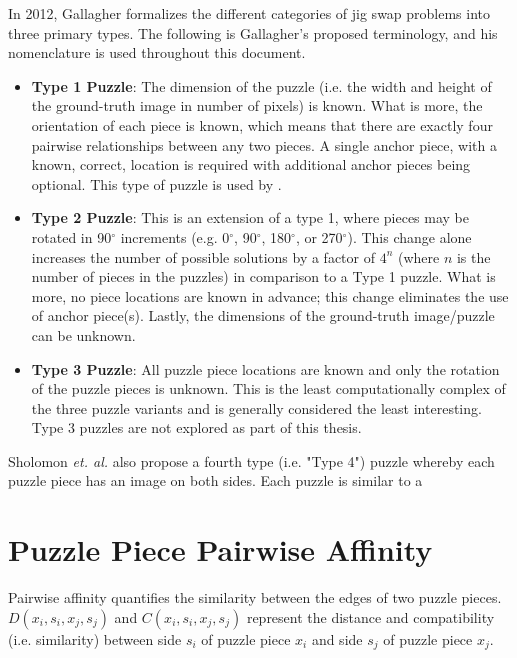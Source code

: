 \documentclass{report}
\newcommand{\numbwithdegreesymbol}[1]{#1$^\circ$}
\begin{document}
In 2012, Gallagher \cite{gallagher2012} formalizes the different categories of jig swap problems into three primary types.  The following is Gallagher's proposed terminology, and his nomenclature is used throughout this document.

\begin{itemize}

	\item \textbf{Type 1 Puzzle}: The dimension of the puzzle (i.e. the width and height of the ground-truth image in number of pixels) is known.  What is more, the orientation of each piece is known, which means that there are exactly four pairwise relationships between any two pieces.  A single anchor piece, with a known, correct, location is required with additional anchor pieces being optional.  This type of puzzle is used by \cite{cho2010, pomeranz2011}.
	
	\item \textbf{Type 2 Puzzle}: This is an extension of a type 1, where pieces may be rotated in \numbwithdegreesymbol{90} increments (e.g. \numbwithdegreesymbol{0}, \numbwithdegreesymbol{90}, \numbwithdegreesymbol{180}, or \numbwithdegreesymbol{270}).  This change alone increases the number of possible solutions by a factor of $4^n$ (where $n$ is the number of pieces in the puzzles) in comparison to a Type 1 puzzle.  What is more, no piece locations are known in advance; this change eliminates the use of anchor piece(s).  Lastly, the dimensions of the ground-truth image/puzzle can be unknown.
	
	\item \textbf{Type 3 Puzzle}: All puzzle piece locations are known and only the rotation of the puzzle pieces is unknown.  This is the least computationally complex of the three puzzle variants and is generally considered the least interesting.  Type 3 puzzles are not explored as part of this thesis.

\end{itemize}

Sholomon \textit{et. al.} also propose a fourth type (i.e. "Type 4") puzzle whereby each puzzle piece has an image on both sides.  Each puzzle is similar to a 

\pagebreak
\section{Puzzle Piece Pairwise Affinity}\label{sec:piecePairwiseAffinity}

Pairwise affinity quantifies the similarity between the edges of two puzzle pieces.  $D(x_i, s_i, x_j, s_j)$ and $C(x_i, s_i, x_j, s_j)$ represent the distance and compatibility (i.e. similarity) between side $s_i$ of puzzle piece $x_i$ and side $s_j$ of puzzle piece $x_j$.  
\end{document}
